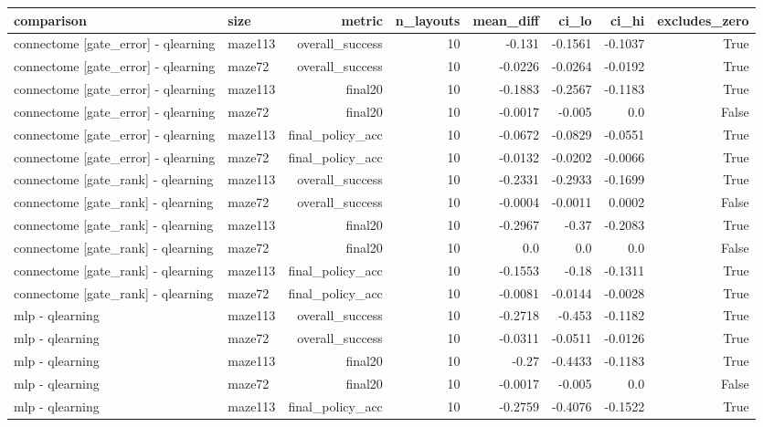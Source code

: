 \begin{table}[t]
\centering
\small
\begin{tabular}{llrrrrrr}
\toprule
comparison & size & metric & n\_layouts & mean\_diff & ci\_lo & ci\_hi & excludes\_zero \\
\midrule
connectome [gate\_error] - qlearning & maze113 & overall\_success & 10 & -0.131 & -0.1561 & -0.1037 & True \\
connectome [gate\_error] - qlearning & maze72 & overall\_success & 10 & -0.0226 & -0.0264 & -0.0192 & True \\
connectome [gate\_error] - qlearning & maze113 & final20 & 10 & -0.1883 & -0.2567 & -0.1183 & True \\
connectome [gate\_error] - qlearning & maze72 & final20 & 10 & -0.0017 & -0.005 & 0.0 & False \\
connectome [gate\_error] - qlearning & maze113 & final\_policy\_acc & 10 & -0.0672 & -0.0829 & -0.0551 & True \\
connectome [gate\_error] - qlearning & maze72 & final\_policy\_acc & 10 & -0.0132 & -0.0202 & -0.0066 & True \\
connectome [gate\_rank] - qlearning & maze113 & overall\_success & 10 & -0.2331 & -0.2933 & -0.1699 & True \\
connectome [gate\_rank] - qlearning & maze72 & overall\_success & 10 & -0.0004 & -0.0011 & 0.0002 & False \\
connectome [gate\_rank] - qlearning & maze113 & final20 & 10 & -0.2967 & -0.37 & -0.2083 & True \\
connectome [gate\_rank] - qlearning & maze72 & final20 & 10 & 0.0 & 0.0 & 0.0 & False \\
connectome [gate\_rank] - qlearning & maze113 & final\_policy\_acc & 10 & -0.1553 & -0.18 & -0.1311 & True \\
connectome [gate\_rank] - qlearning & maze72 & final\_policy\_acc & 10 & -0.0081 & -0.0144 & -0.0028 & True \\
mlp - qlearning & maze113 & overall\_success & 10 & -0.2718 & -0.453 & -0.1182 & True \\
mlp - qlearning & maze72 & overall\_success & 10 & -0.0311 & -0.0511 & -0.0126 & True \\
mlp - qlearning & maze113 & final20 & 10 & -0.27 & -0.4433 & -0.1183 & True \\
mlp - qlearning & maze72 & final20 & 10 & -0.0017 & -0.005 & 0.0 & False \\
mlp - qlearning & maze113 & final\_policy\_acc & 10 & -0.2759 & -0.4076 & -0.1522 & True \\

\end{tabular}
\end{table}
